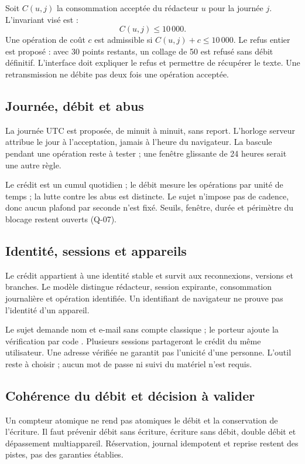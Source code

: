 Soit $C(u,j)$ la consommation acceptée du rédacteur $u$ pour la journée $j$. L'invariant visé est :
\[
  C(u,j) \leq 10\,000.
\]
Une opération de coût $c$ est admissible si $C(u,j)+c\leq10\,000$. Le refus entier est proposé : avec 30 points restants, un collage de 50 est refusé sans débit définitif. L'interface doit expliquer le refus et permettre de récupérer le texte. Une retransmission ne débite pas deux fois une opération acceptée.

\subsection{Journée, débit et abus}

La journée UTC est proposée, de minuit à minuit, sans report. L'horloge serveur attribue le jour à l'acceptation, jamais à l'heure du navigateur. La bascule pendant une opération reste à tester ; une fenêtre glissante de 24 heures serait une autre règle.

Le crédit est un cumul quotidien ; le débit mesure les opérations par unité de temps ; la lutte contre les abus est distincte. Le sujet n'impose pas de cadence, donc aucun plafond par seconde n'est fixé. Seuils, fenêtre, durée et périmètre du blocage restent ouverts (Q-07).

\subsection{Identité, sessions et appareils}

Le crédit appartient à une identité stable et survit aux reconnexions, versions et branches. Le modèle distingue rédacteur, session expirante, consommation journalière et opération identifiée. Un identifiant de navigateur ne prouve pas l'identité d'un appareil.

Le sujet demande nom et e-mail sans compte classique ; le porteur ajoute la vérification par code \cite{sujet,decisions-porteur}. Plusieurs sessions partageront le crédit du même utilisateur. Une adresse vérifiée ne garantit pas l'unicité d'une personne. L'outil reste à choisir ; aucun mot de passe ni suivi du matériel n'est requis.

\subsection{Cohérence du débit et décision à valider}

Un compteur atomique ne rend pas atomiques le débit et la conservation de l'écriture. Il faut prévenir débit sans écriture, écriture sans débit, double débit et dépassement multiappareil. Réservation, journal idempotent et reprise restent des pistes, pas des garanties établies.


